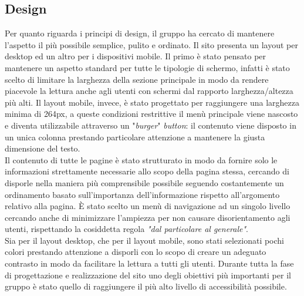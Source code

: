 \subsection{Design}\label{design}
Per quanto riguarda i principi di design, il gruppo ha cercato di mantenere l'aspetto il più possibile semplice, pulito e ordinato. Il sito presenta un layout per desktop ed un altro per i dispositivi mobile. Il primo è stato pensato per mantenere un aspetto standard per tutte le tipologie di schermo, infatti è stato scelto di limitare la larghezza della sezione principale in modo da rendere piacevole la lettura anche agli utenti con schermi dal rapporto larghezza/altezza più alti. Il layout mobile, invece, è stato progettato per raggiungere una larghezza minima di 264px, a queste condizioni restrittive il menù principale viene nascosto e diventa utilizzabile attraverso un "\textit{burger}" \textit{button}: il contenuto viene disposto in un unica colonna prestando particolare attenzione a mantenere la giusta dimensione del testo.\\
Il contenuto di tutte le pagine è stato strutturato in modo da fornire solo le informazioni strettamente necessarie allo scopo della pagina stessa, cercando di disporle nella maniera più comprensibile possibile seguendo costantemente un ordinamento basato sull'importanza dell'informazione rispetto all'argomento relativo alla pagina. È stato scelto un menù di navigazione ad un singolo livello cercando anche di minimizzare l'ampiezza per non causare disorientamento agli utenti, rispettando la cosiddetta regola \textit{"dal particolare al generale"}.\\
Sia per il layout desktop, che per il layout mobile, sono stati selezionati pochi colori prestando attenzione a disporli con lo scopo di creare un adeguato contrasto in modo da facilitare la lettura a tutti gli utenti. Durante tutta la fase di progettazione e realizzazione del sito uno degli obiettivi più importanti per il gruppo è stato quello di raggiungere il più alto livello di accessibilità possibile.

